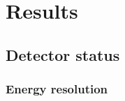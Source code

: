 \chapter{Results}
\label{ch:results}






\section{Detector status}
\label{sec:detectorstatus}







\subsection{Energy resolution}
\label{results:resolution}